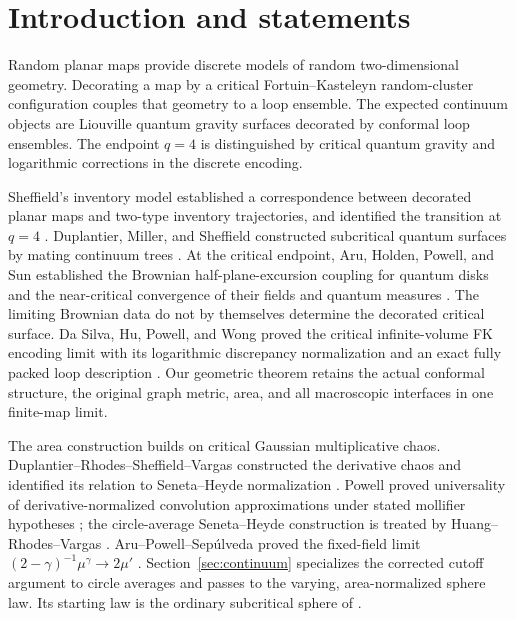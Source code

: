 \begin{abstract}
We construct the field and area law of the unit-area critical Liouville
quantum sphere as a limit of ordinary subcritical quantum spheres, and
equip it with its critical intrinsic metric. We then prove that spherical
Fortuin--Kasteleyn planar maps at $q=4$, embedded by their equilateral flag
uniformizations, converge jointly to this sphere decorated by an independent
nested conformal loop ensemble $\CLE_4$. With deterministic distance
normalization, the convergence includes the area measure, the full embedded
distance function, and every macroscopic interface through all positive
integer edge counts.
\end{abstract}

\section{Introduction and statements}\label{sec:intro}

Random planar maps provide discrete models of random two-dimensional geometry. Decorating a map by a critical Fortuin--Kasteleyn random-cluster configuration \cite{FortuinKasteleyn1972} couples that geometry to a loop ensemble. The expected continuum objects are Liouville quantum gravity surfaces decorated by conformal loop ensembles. The endpoint $q=4$ is distinguished by critical quantum gravity and logarithmic corrections in the discrete encoding.

Sheffield's inventory model established a correspondence between decorated
planar maps and two-type inventory trajectories, and identified the transition
at $q=4$ \cite{SheffieldInventory}.  Duplantier, Miller, and Sheffield
constructed subcritical quantum surfaces by mating continuum trees
\cite{DMS}.  At the critical endpoint, Aru, Holden, Powell, and Sun established
the Brownian half-plane-excursion coupling for quantum disks and the
near-critical convergence of their fields and quantum measures
\cite{AHPScritical}.  The limiting Brownian data do not by themselves determine
the decorated critical surface.  Da Silva, Hu, Powell, and Wong proved the
critical infinite-volume FK encoding limit with its logarithmic discrepancy normalization and
an exact fully packed loop description \cite{DSHPW}.  Our geometric theorem
retains the actual conformal structure, the original graph metric, area, and
all macroscopic interfaces in one finite-map limit.

The area construction builds on critical Gaussian multiplicative chaos.
Duplantier--Rhodes--Sheffield--Vargas constructed the derivative chaos and
identified its relation to Seneta--Heyde normalization
\cite{DRSVderivative,DRSV}.  Powell proved universality of derivative-normalized
convolution approximations under stated mollifier hypotheses \cite{Powell};
the circle-average Seneta--Heyde construction is treated by
Huang--Rhodes--Vargas \cite[Theorem~4.2]{HRVcriticalDisk}.
Aru--Powell--Sep\'ulveda proved the fixed-field limit
$(2-\gamma)^{-1}\mu^\gamma\to2\mu'$ \cite[Theorem~1.1]{APS}.
Section~\ref{sec:continuum} specializes the corrected cutoff argument to
circle averages and passes to the varying, area-normalized sphere law.
Its starting law is the ordinary subcritical sphere of
\cite[Definition~4.21(ii) and Proposition~A.13]{DMS}.

